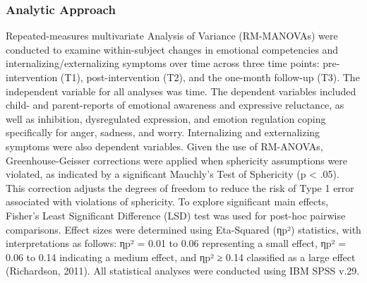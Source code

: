 \subsubsection{Analytic Approach} 
Repeated-measures multivariate Analysis of Variance (RM-MANOVAs) were conducted to examine within-subject changes in emotional competencies and internalizing/externalizing symptoms over time across three time points: pre-intervention (T1), post-intervention (T2), and the one-month follow-up (T3). The independent variable for all analyses was time. The dependent variables included child- and parent-reports of emotional awareness and expressive reluctance, as well as inhibition, dysregulated expression, and emotion regulation coping specifically for anger, sadness, and worry. Internalizing and externalizing symptoms were also dependent variables. Given the use of RM-ANOVAs, Greenhouse-Geisser corrections were applied when sphericity assumptions were violated, as indicated by a significant Mauchly’s Test of Sphericity (p < .05). This correction adjusts the degrees of freedom to reduce the risk of Type 1 error associated with violations of sphericity. To explore significant main effects, Fisher’s Least Significant Difference (LSD) test was used for post-hoc pairwise comparisons. Effect sizes were determined using Eta-Squared (ηp²) statistics, with interpretations as follows: ηp² = 0.01 to 0.06 representing a small effect, ηp² = 0.06 to 0.14 indicating a medium effect, and ηp² ≥ 0.14 classified as a large effect (Richardson, 2011). All statistical analyses were conducted using IBM SPSS v.29.
